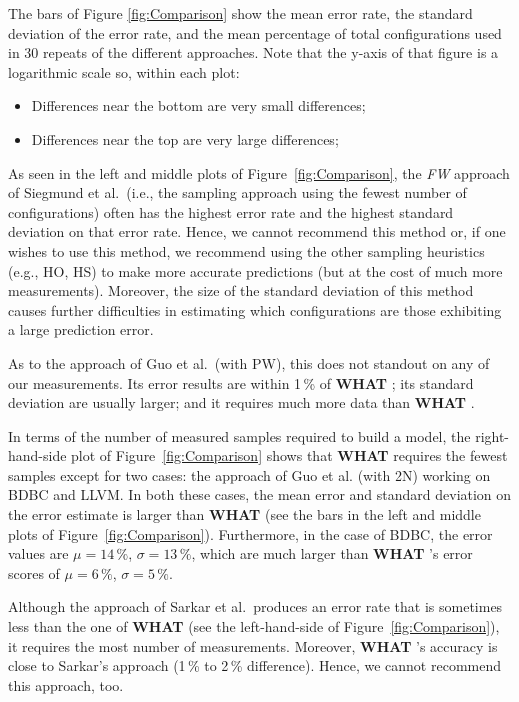 \documentclass{newsig}
\newcommand{\what}{{\bf WHAT }}
\begin{document}
 The  bars of Figure \ref{fig:Comparison} show the
 mean error rate, the standard deviation of the error rate, and the mean percentage
 of total configurations used in 30 repeats of the different approaches.
 Note that the y-axis of that figure is a logarithmic scale so, within each plot:
 \begin{itemize}
 \item Differences near the bottom  are very small differences;
 \item Differences near the top   are very large differences;
 \end{itemize}
 
As seen in the left and middle plots of
Figure~\ref{fig:Comparison}, 
the {\em FW} approach of Siegmund et al.\ (i.e., the sampling approach using the fewest number of configurations) often has the highest
error rate and the highest
standard deviation on that error rate. Hence,
we cannot recommend this method or,  if one wishes to use this method, we recommend using the other sampling heuristics (e.g., HO, HS) to make more accurate predictions (but at the cost of much more measurements). Moreover, the size of the standard deviation of this method causes further difficulties in estimating which configurations are those exhibiting a large prediction error. 

As to the approach of Guo et al.\ (with PW), this   does not standout on any of
our measurements. Its error results are within 1\,\% of \what;
 its standard deviation are usually larger; and it requires
 much more data than \what.
 
 In terms of the number of measured samples required to build a model, 
 the right-hand-side plot of  Figure~\ref{fig:Comparison}  shows that
 \what requires the fewest samples except for two cases:
 the approach of Guo et al. (with 2N) working on BDBC and LLVM.  In both these cases, the mean error and standard deviation on the error
 estimate is   larger than \what  (see the  bars in the left and middle plots   of Figure~\ref{fig:Comparison}). Furthermore, in the case of BDBC, the error values
 are $\mu=14\,\%$, $\sigma=13\,\%$, which are much larger
than \what{}'s error scores of $\mu=6\,\%$, $\sigma=5\,\%$. 


Although the approach of Sarkar et al.\ produces an error rate that is sometimes less than the one of \what (see the left-hand-side of
Figure~\ref{fig:Comparison}), it requires the most number of measurements. Moreover, \what's accuracy is close to Sarkar's approach (1\,\%
to 2\,\% difference). Hence, we cannot recommend this approach, too.
\end{document}
